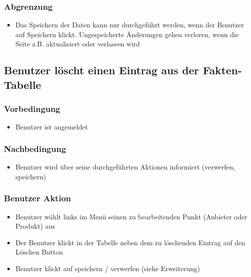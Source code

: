 \documentclass[a4paper,12pt]{article}
\begin{document}
\subsubsection{Abgrenzung}\label{abgrenzung-9}

\begin{itemize}

\item
  Das Speichern der Daten kann nur durchgeführt werden, wenn der
  Benutzer auf Speichern klickt. Ungespeicherte Änderungen gehen
  verloren, wenn die Seite z.B. aktualisiert oder verlassen wird
\end{itemize}

\subsection{Benutzer löscht einen Eintrag aus der Fakten-Tabelle}\label{benutzer-loscht-einen-eintrag-aus-der-fakten-tabelle}

\subsubsection{Vorbedingung}\label{vorbedingung-10}

\begin{itemize}

\item
  Benutzer ist angemeldet
\end{itemize}

\subsubsection{Nachbedingung}\label{nachbedingung-10}

\begin{itemize}

\item
  Benutzer wird über seine durchgeführten Aktionen informiert
  (verwerfen, speichern)
\end{itemize}

\subsubsection{Benutzer Aktion}\label{benutzer-aktion-10}

\begin{itemize}

\item
  Benutzer wählt links im Menü seinen zu bearbeitenden Punkt (Anbieter
  oder Produkt) aus
\item
  Der Benutzer klickt in der Tabelle neben dem zu löschenden Eintrag auf
  den Löschen Button
\item
  Benutzer klickt auf speichern / verwerfen (siehe Erweiterung)
\end{itemize}
\end{document}
